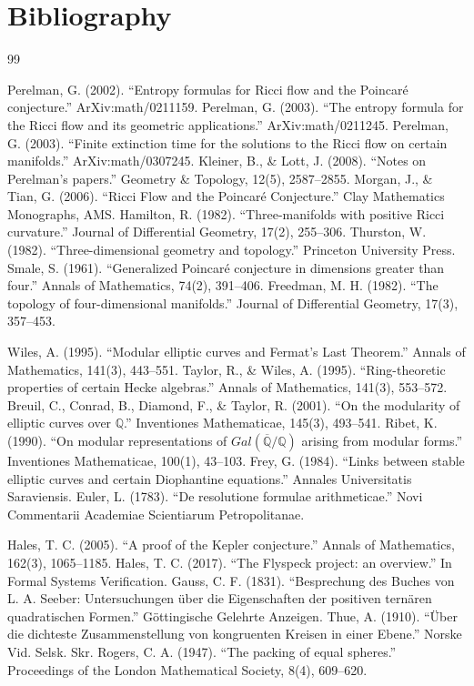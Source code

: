 \chapter*{Bibliography}
\begin{thebibliography}{99}

 Perelman, G. (2002). ``Entropy formulas for Ricci flow and the Poincar\'e conjecture.'' ArXiv:math/0211159.
 Perelman, G. (2003). ``The entropy formula for the Ricci flow and its geometric applications.'' ArXiv:math/0211245.
 Perelman, G. (2003). ``Finite extinction time for the solutions to the Ricci flow on certain manifolds.'' ArXiv:math/0307245.
 Kleiner, B., \& Lott, J. (2008). ``Notes on Perelman's papers.'' Geometry \& Topology, 12(5), 2587--2855.
 Morgan, J., \& Tian, G. (2006). ``Ricci Flow and the Poincar\'e Conjecture.'' Clay Mathematics Monographs, AMS.
 Hamilton, R. (1982). ``Three-manifolds with positive Ricci curvature.'' Journal of Differential Geometry, 17(2), 255--306.
 Thurston, W. (1982). ``Three-dimensional geometry and topology.'' Princeton University Press.
 Smale, S. (1961). ``Generalized Poincar\'e conjecture in dimensions greater than four.'' Annals of Mathematics, 74(2), 391--406.
 Freedman, M. H. (1982). ``The topology of four-dimensional manifolds.'' Journal of Differential Geometry, 17(3), 357--453.

 Wiles, A. (1995). ``Modular elliptic curves and Fermat's Last Theorem.'' Annals of Mathematics, 141(3), 443--551.
 Taylor, R., \& Wiles, A. (1995). ``Ring-theoretic properties of certain Hecke algebras.'' Annals of Mathematics, 141(3), 553--572.
 Breuil, C., Conrad, B., Diamond, F., \& Taylor, R. (2001). ``On the modularity of elliptic curves over $\mathbb{Q}$.'' Inventiones Mathematicae, 145(3), 493--541.
 Ribet, K. (1990). ``On modular representations of $Gal(\overline{\mathbb{Q}}/\mathbb{Q})$ arising from modular forms.'' Inventiones Mathematicae, 100(1), 43--103.
 Frey, G. (1984). ``Links between stable elliptic curves and certain Diophantine equations.'' Annales Universitatis Saraviensis.
 Euler, L. (1783). ``De resolutione formulae arithmeticae.'' Novi Commentarii Academiae Scientiarum Petropolitanae.

 Hales, T. C. (2005). ``A proof of the Kepler conjecture.'' Annals of Mathematics, 162(3), 1065--1185.
 Hales, T. C. (2017). ``The Flyspeck project: an overview.'' In Formal Systems Verification.
 Gauss, C. F. (1831). ``Besprechung des Buches von L. A. Seeber: Untersuchungen \"uber die Eigenschaften der positiven tern\"aren quadratischen Formen.'' G\"ottingische Gelehrte Anzeigen.
 Thue, A. (1910). ``\"Uber die dichteste Zusammenstellung von kongruenten Kreisen in einer Ebene.'' Norske Vid. Selsk. Skr.
 Rogers, C. A. (1947). ``The packing of equal spheres.'' Proceedings of the London Mathematical Society, 8(4), 609--620.


\end{thebibliography}
